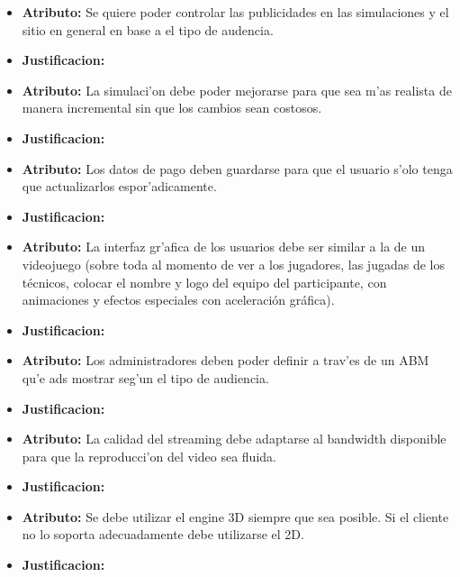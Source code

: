 \begin{itemize}


\item \textbf{Atributo:} Se quiere poder controlar las publicidades en las simulaciones y el sitio en general en base a el tipo de audencia.
\item \textbf{Justificacion:}

\item \textbf{Atributo:} La simulaci'on debe poder mejorarse para que sea m'as realista de manera incremental sin que los cambios sean costosos.
\item \textbf{Justificacion:}

\item \textbf{Atributo:} Los datos de pago deben guardarse para que el usuario s'olo tenga que actualizarlos espor'adicamente.
\item \textbf{Justificacion:}

\item \textbf{Atributo:}  La interfaz gr'afica de los usuarios debe ser similar a la de un videojuego (sobre toda al momento de ver a los jugadores, las jugadas de los técnicos, colocar el nombre y logo del equipo del participante, con animaciones y efectos especiales con aceleración gráfica).
\item \textbf{Justificacion:}

\item \textbf{Atributo:} Los administradores deben poder definir a trav'es de un ABM qu'e ads mostrar seg'un el tipo de audiencia.
\item \textbf{Justificacion:}

\item \textbf{Atributo:} La calidad del streaming debe adaptarse al bandwidth disponible para que la reproducci'on del video sea fluida.
\item \textbf{Justificacion:}

\item \textbf{Atributo:} Se debe utilizar el engine 3D siempre que sea posible. Si el cliente no lo soporta adecuadamente debe utilizarse el 2D.
\item \textbf{Justificacion:}


\end{itemize}
